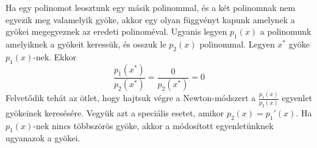 \documentclass[a4paper,12pt]{report}
\begin{document}
			Ha egy polinomot leosztunk egy másik polinommal, és a két polinomnak nem egyezik meg valamelyik gyöke, akkor egy olyan függvényt kapunk amelynek a gyökei megegyeznek az eredeti polinoméval. Ugyanis legyen $p_1(x)$ a polinomunk amelyiknek a gyökeit keressük, és osszuk le $p_2(x)$ polinommal. Legyen $x^*$ gyöke $p_1(x)$-nek. Ekkor
			\[ \frac{p_1(x^*)}{p_2(x^*)}=\frac{0}{p_2(x^*)}=0\]
			Felvetődik tehát az ötlet, hogy hajtsuk végre a Newton-módszert a $\frac{p_1(x)}{p_2(x)}$ egyenlet gyökeinek keresésére. Vegyük azt a speciális esetet, amikor $p_2(x)=p_1'(x)$. Ha $p_1(x)$-nek nincs többszörös gyöke, akkor a módosított egyenletünknek ugyanazok a gyökei.

			\begin{figure}[ht]
				\hfill
				\caption{}
			\end{figure}











\end{document}
